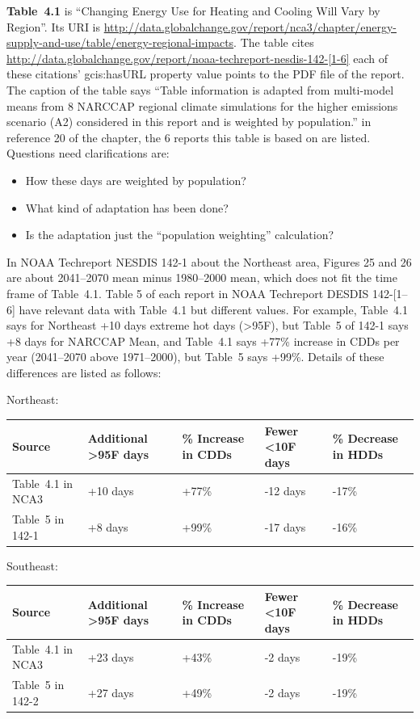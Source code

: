 \textbf{Table~4.1} is ``Changing Energy Use for Heating and Cooling Will Vary by Region''. Its 
URI is \url{http://data.globalchange.gov/report/nca3/chapter/energy-supply-and-use/table/energy-regional-impacts}.
The table cites \url{http://data.globalchange.gov/report/noaa-techreport-nesdis-142-[1-6]} each of these citations' gcis:hasURL property value points to the PDF file of the report.
The caption of the table says ``Table information is adapted from multi-model means from 8 NARCCAP regional climate simulations for the higher emissions scenario (A2) considered in this report and is weighted by population.'' in reference 20 of the chapter, the 6 reports this table is based on are listed.
Questions need clarifications are:
\begin{itemize}
\item How these days are weighted by population? 
\item What kind of adaptation has been done? 
\item Is the adaptation just the ``population weighting'' calculation?
\end{itemize}
In NOAA Techreport NESDIS 142-1 about the Northeast area, Figures 25 and 26 are about 2041--2070 mean minus 1980--2000 mean, which does not fit the time frame of Table~4.1.
Table 5 of each report in NOAA Techreport DESDIS 142-[1--6] have relevant data with Table~4.1 but different values.
For example, Table~4.1 says for Northeast +10 days extreme hot days (>95F), but Table~5 of 142-1 says +8 days for NARCCAP Mean, and Table~4.1 says +77\% increase in CDDs per year (2041--2070 above 1971--2000), but Table~5 says +99\%. Details of these differences are listed as follows:

Northeast:

\begin{tabular}{|l|p{}|p{}|p{}|p{}|}
	\hline
Source & Additional >95F days & \% Increase in CDDs & Fewer <10F days & \% Decrease in HDDs \\ 
\hline
Table~4.1 in NCA3	& +10 days & +77\% & -12 days & -17\% \\ 
\hline
Table~5 in 142-1	& +8 days & +99\% & -17 days & -16\% \\
\hline
\end{tabular}

\mbox{}

Southeast:

\begin{tabular}{|l|p{}|p{}|p{}|p{}|}
	\hline
	Source & Additional >95F days & \% Increase in CDDs & Fewer <10F days & \% Decrease in HDDs \\ 
	\hline
Table~4.1 in NCA3 & +23 days & +43\% & -2 days & -19\% \\
\hline
Table~5 in 142-2 & +27 days & +49\% & -2 days & -19\% \\
\hline
\end{tabular}

